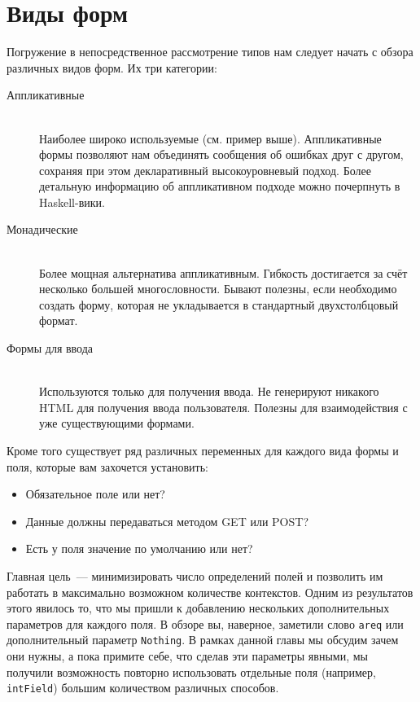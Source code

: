 \section{Виды форм}
Погружение в непосредственное рассмотрение типов нам следует начать с обзора
различных видов форм. Их три категории:
\begin{description}
    \item[Аппликативные] \hfill \\
        Наиболее широко используемые (см. пример выше). Аппликативные формы
        позволяют нам объединять сообщения об ошибках друг с другом, сохраняя
        при этом декларативный высокоуровневый подход. Более детальную
        информацию об аппликативном подходе можно почерпнуть
        в~%
        {Haskell-вики}.

    \item[Монадические] \hfill \\
        Более мощная альтернатива аппликативным. Гибкость достигается за счёт
        несколько большей многословности. Бывают полезны, если необходимо
        создать форму, которая не укладывается в стандартный двухстолбцовый
        формат.

    \item[Формы для ввода] \hfill \\
        Используются только для получения ввода. Не генерируют никакого HTML для
        получения ввода пользователя. Полезны для взаимодействия с уже
        существующими формами.
\end{description}

Кроме того существует ряд различных переменных для каждого вида формы и поля,
которые вам захочется установить:
\begin{itemize}
    \item Обязательное поле или нет?
    \item Данные должны передаваться методом GET или POST?
    \item Есть у поля значение по умолчанию или нет?
\end{itemize}

Главная цель~--- минимизировать число определений полей и позволить им
работать в максимально возможном количестве контекстов. Одним из результатов
этого явилось то, что мы пришли к добавлению нескольких дополнительных параметров для
каждого поля. В обзоре вы, наверное, заметили слово \lstinline'areq' или
дополнительный параметр \lstinline'Nothing'. В рамках
данной главы мы обсудим зачем они нужны, а пока примите себе, что сделав
эти параметры явными, мы получили возможность повторно использовать отдельные
поля (например,~%
%
{\lstinline'intField'}) большим количеством различных способов.

